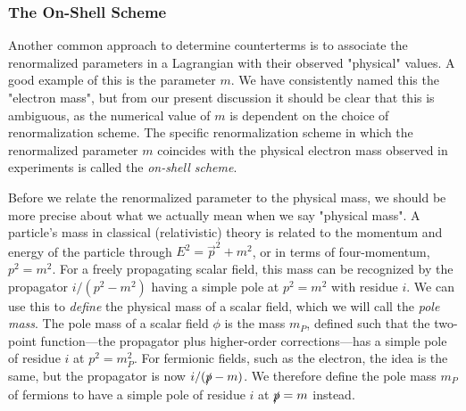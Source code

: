 \subsubsection{The On-Shell Scheme}
Another common approach to determine counterterms is to associate the renormalized parameters in a Lagrangian with their observed "physical" values.
A good example of this is the parameter $m$. We have consistently named this the "electron mass", but from our present discussion it should be clear that this is ambiguous, as the numerical value of $m$ is dependent on the choice of renormalization scheme.
The specific renormalization scheme in which the renormalized parameter $m$ coincides with the physical electron mass observed in experiments is called the \emph{on-shell scheme}.

Before we relate the renormalized parameter to the physical mass, we should be more precise about what we actually mean when we say "physical mass".
A particle's mass in classical (relativistic) theory is related to the momentum and energy of the particle through $E^2=\vec{p}^2+m^2$, or in terms of four-momentum, $p^2=m^2$.
For a freely propagating scalar field, this mass can be recognized by the propagator $i/(p^2-m^2)$ having a simple pole at $p^2=m^2$ with residue $i$.
We can use this to \emph{define} the physical mass of a scalar field, which we will call the \emph{pole mass}.
The pole mass of a scalar field $\phi$ is the mass $m_P$, defined such that the two-point function---the propagator plus higher-order corrections---has a simple pole of residue $i$ at $p^2=m_P^2$.
For fermionic fields, such as the electron, the idea is the same, but the propagator is now $i/(\slashed{p}-m)$. We therefore define the pole mass $m_P$ of fermions to have a simple pole of residue $i$ at $\slashed{p}=m$ instead.

